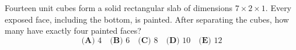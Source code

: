 Fourteen unit cubes form a solid rectangular slab of dimensions $7\times2\times1$. Every exposed face, including the bottom, is painted. After separating the cubes, how many have exactly four painted faces?
\[\textbf{(A) }4\quad\textbf{(B) }6\quad\textbf{(C) }8\quad\textbf{(D) }10\quad\textbf{(E) }12\]

